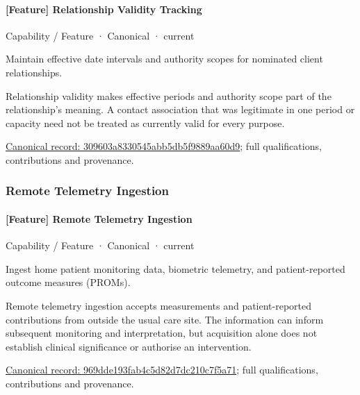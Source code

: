 \paragraph{[Feature] Relationship Validity Tracking}

\label{element:309603a8330545abb5db5f9889aa60d9}
{\small Capability / Feature · Canonical · current}\par

Maintain effective date intervals and authority scopes for nominated client relationships.



Relationship validity makes effective periods and authority scope part of the relationship's meaning. A contact association that was legitimate in one period or capacity need not be treated as currently valid for every purpose.


{\footnotesize \href{../../../../continuum/strategy/capability/feature/309603a8330545abb5db5f9889aa60d9.md}{Canonical record: 309603a8330545abb5db5f9889aa60d9}; full qualifications, contributions and provenance.}\par
\subsubsection{Remote Telemetry Ingestion}

\paragraph{[Feature] Remote Telemetry Ingestion}

\label{element:969dde193fab4c5d82d7dc210c7f5a71}
{\small Capability / Feature · Canonical · current}\par

Ingest home patient monitoring data, biometric telemetry, and patient-reported outcome measures (PROMs).



Remote telemetry ingestion accepts measurements and patient-reported contributions from outside the usual care site. The information can inform subsequent monitoring and interpretation, but acquisition alone does not establish clinical significance or authorise an intervention.


{\footnotesize \href{../../../../continuum/strategy/capability/feature/969dde193fab4c5d82d7dc210c7f5a71.md}{Canonical record: 969dde193fab4c5d82d7dc210c7f5a71}; full qualifications, contributions and provenance.}\par
